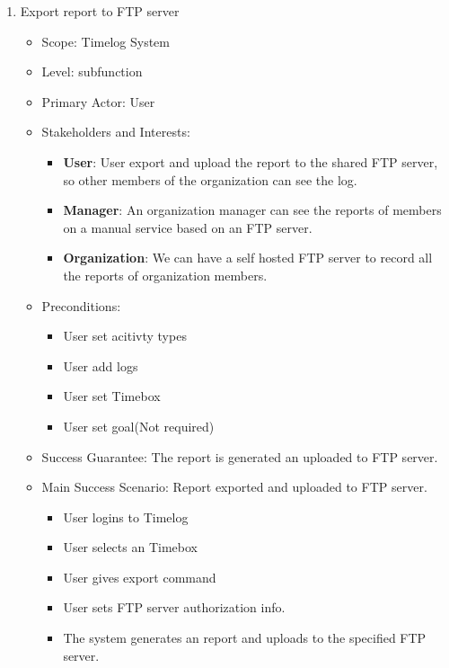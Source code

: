\documentclass[12pt, a4paper]{article}
\begin{document}
\begin{CJK*}{UTF8}{bkai}
\begin{enumerate}
\begin{itemize}
\begin{itemize}
            \end{itemize}
        \end{itemize}
      \item Export report to FTP server
        \begin{itemize}
          \item Scope: Timelog System
          \item Level: subfunction
          \item Primary Actor: User
          \item Stakeholders and Interests:
            \begin{itemize}
              \item {\bf User}: User export and upload the report to the shared FTP server, so other members of the organization can see the log.
              \item {\bf Manager}: An organization manager can see the reports of members on a manual service based on an FTP server.
              \item {\bf Organization}: We can have a self hosted FTP server to record all the reports of organization members.
            \end{itemize}
          \item Preconditions:
            \begin{itemize}
              \item User set acitivty types
              \item User add logs
              \item User set Timebox
              \item User set goal(Not required)
            \end{itemize}
          \item Success Guarantee: The report is generated an uploaded to FTP server.
          \item Main Success Scenario: Report exported and uploaded to FTP server.
            \begin{itemize}
              \item User logins to Timelog
              \item User selects an Timebox
              \item User gives export command
              \item User sets FTP server authorization info.
              \item The system generates an report and uploads to the specified FTP server.
            \end{itemize}

\end{itemize}
\end{enumerate}
\end{CJK*}
\end{document}
